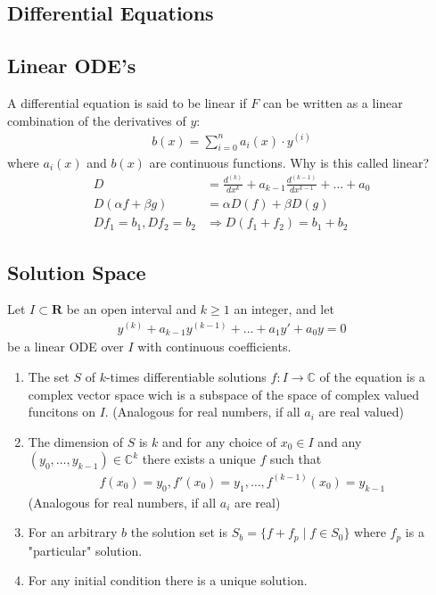 \documentclass[8pt]{extarticle}
\newcommand{\R}{{\mathbb R}}
\newcommand{\C}{{\mathbb C}}
\newcommand{\ra}{{\rightarrow}}
\def\R{\mathbf{R}}
\def\C{\mathbb{C}}
\begin{document}
\setlength{\columnseprule}{0.4pt}
\begin{multicols*}{3}


  \section{Differential Equations}
  \hypertarget{sec:0}{}


  \subsection{Linear ODE's}
  A differential equation is said to be linear if $F$
  can be written as a linear combination of the derivatives of $y$:
  \begin{align*}
    b(x) = \sum_{i = 0}^{n} a_i(x) \cdot y^{(i)}
  \end{align*}
  where $a_i(x)$ and $b(x)$ are continuous functions. Why is
  this called linear?
  \begin{align*}
    D                      & = \frac{d^{(k)}}{dx^k} + a_{k-1} \frac{d^{(k-1)}}{dx^{k-1}} + \dots + a_0 \\
    D(\alpha f + \beta g)  & = \alpha D(f) + \beta D(g)                                                \\
    Df_1 = b_1, Df_2 = b_2 & \Rightarrow D(f_1 + f_2) = b_1 + b_2
  \end{align*}

  \subsection{Solution Space}
  Let $I \subset \R$ be an open interval
  and $k \geq 1$ an integer, and let
 \begin{align*}
   y^{(k)} + a_{k-1}y^{(k-1)} + \dots + a_1 y' + a_0 y = 0
  \end{align*}
  be a linear ODE over $I$ with continuous coefficients.
  \begin{enumerate}[label=(\arabic*)]
    \item The set $S$ of $k$-times differentiable solutions
          $f:I \ra \C$ of the equation is a complex
          vector space wich is a subspace of the space of complex valued
         funcitons on $I$. (Analogous for real numbers, if all
         $a_i$ are real valued)
   \item The dimension of $S$ is $k$ and for any choice of $x_0 \in I$
          and any $(y_0, \dots, y_{k-1}) \in \C^k$ there
          exists a unique $f$ such that
          \begin{align*}
            f(x_0) = y_0, f'(x_0) = y_1, \dots, f^{(k-1)}(x_0) = y_{k-1}
          \end{align*}
          (Analogous for real numbers, if all $a_i$ are real)
    \item For an arbitrary $b$ the solution set is
          $S_b = \{f + f_p \;|\; f \in S_0\}$ where $f_p$ is a "particular"
          solution.
    \item For any initial condition there is a unique solution.
  \end{enumerate}

\end{multicols*}
\end{document}
